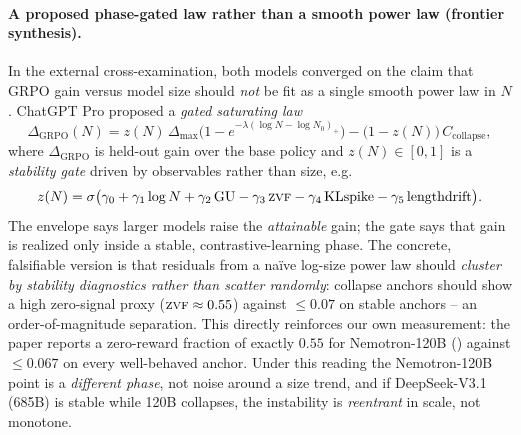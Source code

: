\paragraph{A proposed phase-gated law rather than a smooth power law (frontier synthesis).}
In the external cross-examination, both models converged on the claim that
GRPO gain versus model size should \emph{not} be fit as a single smooth power
law in $N$. ChatGPT Pro proposed a \emph{gated saturating law}
\begin{equation}
  \label{eq:frontier-gated}
  \Delta_{\mathrm{GRPO}}(N)
    = z(N)\,\Delta_{\max}\bigl(1 - e^{-\lambda(\log N - \log N_0)_+}\bigr)
      - \bigl(1 - z(N)\bigr)\,C_{\mathrm{collapse}},
\end{equation}
where $\Delta_{\mathrm{GRPO}}$ is held-out gain over the base policy and
$z(N)\in[0,1]$ is a \emph{stability gate} driven by observables rather than
size, e.g.
\begin{equation}
  \label{eq:frontier-gate}
  z(N) = \sigma\bigl(\gamma_0 + \gamma_1 \log N + \gamma_2\,\mathrm{GU}
         - \gamma_3\,\textsc{zvf} - \gamma_4\,\mathrm{KLspike}
         - \gamma_5\,\mathrm{lengthdrift}\bigr).
\end{equation}
The envelope says larger models raise the \emph{attainable} gain; the gate
says that gain is realized only inside a stable, contrastive-learning phase.
The concrete, falsifiable version is that residuals from a na\"ive log-size
power law should \emph{cluster by stability diagnostics rather than scatter
randomly}: collapse anchors should show a high zero-signal proxy
($\textsc{zvf}\approx 0.55$) against $\le 0.07$ on stable anchors -- an
order-of-magnitude separation. This directly reinforces our own measurement:
the paper reports a zero-reward fraction of exactly $0.55$ for Nemotron-120B
() against $\le 0.067$ on every
well-behaved anchor. Under this reading the Nemotron-120B point is a
\emph{different phase}, not noise around a size trend, and if DeepSeek-V3.1
(685B) is stable while 120B collapses, the instability is \emph{reentrant} in
scale, not monotone.

